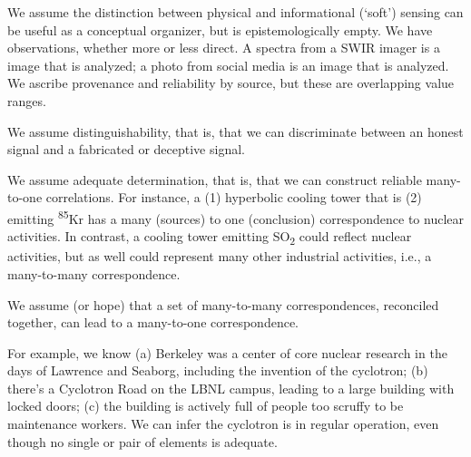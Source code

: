 \documentclass{article} %
\begin{document}
We assume the distinction between physical and informational (`soft') sensing can be useful as a conceptual organizer, but is epistemologically empty. We have observations, whether more or less direct. A spectra from a SWIR imager is a image that is analyzed; a photo from social media is an image that is analyzed. We ascribe provenance and reliability by source, but these are overlapping value ranges.

We assume distinguishability, that is, that we can discriminate between an honest signal and a fabricated or deceptive signal. 

We assume adequate determination, that is, that we can construct reliable many-to-one correlations. For instance, a (1) hyperbolic cooling tower that is (2) emitting \textsuperscript{85}Kr has a many (sources) to one (conclusion) correspondence to nuclear activities. In contrast, a cooling tower emitting SO\textsubscript{2} could reflect nuclear activities, but as well could represent many other industrial activities, i.e., a many-to-many correspondence. 

We assume (or hope) that a set of many-to-many correspondences, reconciled together, can lead to a many-to-one correspondence. 
 
For example, we know (a) Berkeley was a center of core nuclear research in the days of Lawrence and Seaborg, including the invention of the cyclotron; (b) there's a Cyclotron Road on the LBNL campus, leading to a large building with locked doors; (c) the building is actively full of people too scruffy to be maintenance workers. We can infer the cyclotron is in regular operation, even though no single or pair of elements is adequate. 
\end{document}
